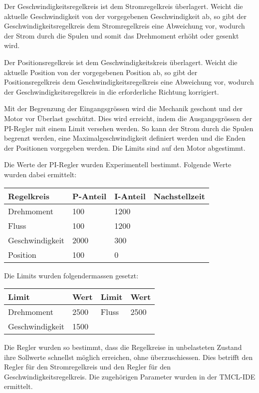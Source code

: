 Der Geschwindigkeitsregelkreis ist dem Stromregelkreis überlagert. Weicht die aktuelle Geschwindigkeit von der vorgegebenen Geschwindigkeit ab, so gibt der Geschwindigkeitsregelkreis dem Stromregelkreis eine Abweichung vor, wodurch der Strom durch die Spulen und somit das Drehmoment erhöht oder gesenkt wird.

Der Positionsregelkreis ist dem Geschwindigkeitskreis überlagert. Weicht die aktuelle Position von der vorgegebenen Position ab, so gibt der Positionsregelkreis dem Geschwindigkeitsregelkreis eine Abweichung vor, wodurch der Geschwindigkeitsregelkreis in die erforderliche Richtung korrigiert.

Mit der Begrenzung der Eingangsgrössen wird die Mechanik geschont und der Motor vor Überlast geschützt. Dies wird erreicht, indem die Ausgangsgrössen der PI-Regler mit einem Limit versehen werden. So kann der Strom durch die Spulen begrenzt werden, eine Maximalgeschwindigkeit definiert werden und die Enden der Positionen vorgegeben werden. Die Limits sind auf den Motor abgestimmt. \cite{stahl_simulation_2014}

Die Werte der PI-Regler wurden Experimentell bestimmt. Folgende Werte wurden dabei ermittelt:

\begin{tabularx}{\linewidth}{|l|X|X|l|}
\hline
\textbf{Regelkreis} & \textbf{P-Anteil} & \textbf{I-Anteil} & \textbf{Nachstellzeit}\\
\hline
Drehmoment & 100 & 1200 & \\
\hline
Fluss & 100 & 1200 & \\
\hline
Geschwindigkeit & 2000 & 300 & \\
\hline
Position & 100 & 0 & \\
\hline
\end{tabularx}


Die Limits wurden folgendermassen gesetzt:

\begin{tabularx}{\linewidth}{|l|X||l|X|}
\hline
\textbf{Limit} & \textbf{Wert} & \textbf{Limit} & \textbf{Wert}\\
\hline
Drehmoment & 2500 & Fluss & 2500\\
\hline
Geschwindigkeit & 1500 &  & \\
\hline
\end{tabularx}

Die Regler wurden so bestimmt, dass die Regelkreise in unbelasteten Zustand ihre Sollwerte schnellst möglich erreichen, ohne überzuschiessen. Dies betrifft den Regler für den Stromregelkreis und den Regler für den Geschwindigkeitsregelkreis. Die zugehörigen Parameter wurden in der TMCL-IDE ermittelt. 

